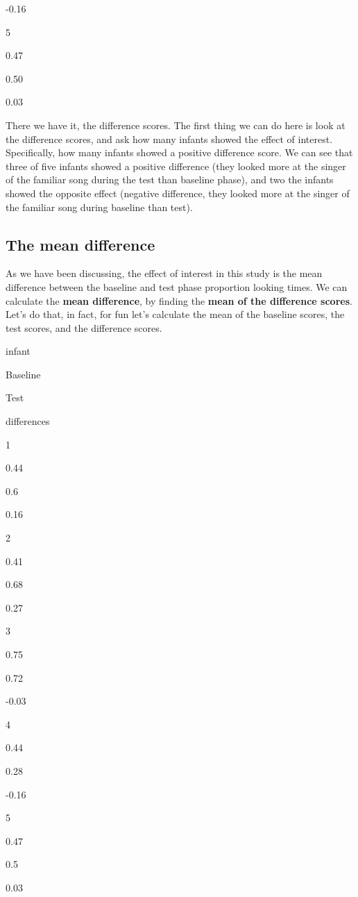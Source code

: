 \documentclass[
]{book}
\begin{document}
-0.16

5

0.47

0.50

0.03

There we have it, the difference scores. The first thing we can do here is look at the difference scores, and ask how many infants showed the effect of interest. Specifically, how many infants showed a positive difference score. We can see that three of five infants showed a positive difference (they looked more at the singer of the familiar song during the test than baseline phase), and two the infants showed the opposite effect (negative difference, they looked more at the singer of the familiar song during baseline than test).

\hypertarget{the-mean-difference}{%
\subsection{The mean difference}\label{the-mean-difference}}

As we have been discussing, the effect of interest in this study is the mean difference between the baseline and test phase proportion looking times. We can calculate the \textbf{mean difference}, by finding the \textbf{mean of the difference scores}. Let's do that, in fact, for fun let's calculate the mean of the baseline scores, the test scores, and the difference scores.

infant

Baseline

Test

differences

1

0.44

0.6

0.16

2

0.41

0.68

0.27

3

0.75

0.72

-0.03

4

0.44

0.28

-0.16

5

0.47

0.5

0.03
\end{document}
